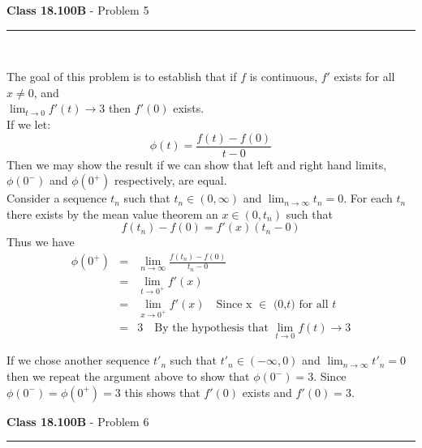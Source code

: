 \documentclass[11pt,reqno]{article}
\begin{document}
\newpage

\vspace{15pt}
\begin{flushleft} 
\textbf{Class 18.100B} - Problem 5\\
\rule{500pt}{1pt}\\
\end{flushleft} 

The goal of this problem is to establish that if $f$ is continuous, $f'$ exists for all $x \neq 0$, and \\$\lim_{t \to 0}f'(t) \to 3$ then $f'(0)$ exists.\\
\indent If we let:
\[\phi(t) = \frac{f(t) - f(0)}{t - 0}\]
Then we may show the result if we can show that left and right hand limits, $\phi(0^-)$ and $\phi(0^+)$ respectively, are equal.\\
\indent Consider a sequence $t_n$ such that $t_n \in (0,\infty)$ and $\lim_{n \to \infty}t_n = 0$. For each $t_n$ there exists by the mean value theorem an $x \in (0,t_n)$ such that
\[ f(t_n) - f(0) = f'(x)(t_n - 0)\]
Thus we have
\begin{eqnarray*}
\phi(0^+) &=& \lim_{n \to \infty} \frac{f(t_n) - f(0)}{t_n - 0} \\
	       &=& \lim_{t \to 0^+} f'(x) \\
      	       &=& \lim_{x \to 0^+} f'(x) \quad \text{Since x $\in$ (0,$t$) for all $t$}\\
	       &=& 3 \quad \text{By the hypothesis that $\lim_{t \to 0}f(t) \to 3$}
\end{eqnarray*}

If we chose another sequence $t'_n$ such that $t'_n \in (-\infty,0)$ and $\lim_{n \to \infty}t'_n = 0$
then we repeat the argument above to show that $\phi(0^-) = 3$. Since $\phi(0^-) = \phi(0^+) = 3$ this shows that $f'(0)$ exists and $f'(0) = 3$.

\vspace{15pt}
\begin{flushleft} 
\textbf{Class 18.100B} - Problem 6\\
\rule{500pt}{1pt}\\
\end{flushleft} 
\end{document}

